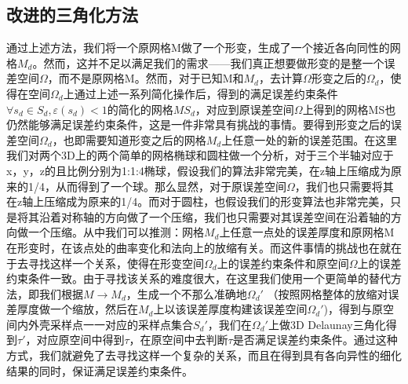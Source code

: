 \subsection{改进的三角化方法}
通过上述方法，我们将一个原网格M做了一个形变，生成了一个接近各向同性的网格$M_d$。然而，这并不足以满足我们的需求——我们真正想要做形变的是整一个误差空间$\Omega$，而不是原网格M。然而，对于已知M和$M_d$，去计算$\Omega$形变之后的$\Omega_d$，使得在空间$\Omega_d$上通过上述一系列简化操作后，得到的满足误差约束条件$\forall s_d \in S_d, \varepsilon(s_d)<1$的简化的网格$MS_d$，对应到原误差空间$\Omega$上得到的网格MS也仍然能够满足误差约束条件，这是一件非常具有挑战的事情。要得到形变之后的误差空间$\Omega_d$，也即需要知道形变之后的网格$M_d$上任意一处的新的误差范围。在这里我们对两个3D上的两个简单的网格椭球和圆柱做一个分析，对于三个半轴对应于x，y，z的且比例分别为1:1:4椭球，假设我们的算法非常完美，在z轴上压缩成为原来的1/4，从而得到了一个球。那么显然，对于原误差空间$\Omega$，我们也只需要将其在z轴上压缩成为原来的1/4。而对于圆柱，也假设我们的形变算法也非常完美，只是将其沿着对称轴的方向做了一个压缩，我们也只需要对其误差空间在沿着轴的方向做一个压缩。从中我们可以推测：网格$M_d$上任意一点处的误差厚度和原网格M在形变时，在该点处的曲率变化和法向上的放缩有关。而这件事情的挑战也在就在于去寻找这样一个关系，使得在形变空间$\Omega_d$上的误差约束条件和原空间$\Omega$上的误差约束条件一致。由于寻找该关系的难度很大，在这里我们使用一个更简单的替代方法，即我们根据$M \to M_d$，生成一个不那么准确地$\Omega_d'$ （按照网格整体的放缩对误差厚度做一个缩放，然后在$M_d$上以该误差厚度构建该误差空间$\Omega_d'$)，得到与原空间内外壳采样点一一对应的采样点集合$S_d′$，我们在$\Omega_d'$上做3D Delaunay三角化得到$\tau′$，对应原空间中得到$\tau$，在原空间中去判断$\tau$是否满足误差约束条件。通过这种方式，我们就避免了去寻找这样一个复杂的关系，而且在得到具有各向异性的细化结果的同时，保证满足误差约束条件。

